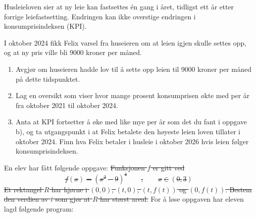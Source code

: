 Husleieloven sier at ny leie kan fastsettes én gang i året, tidligst
ett år etter forrige leiefastsetting. Endringen kan ikke overstige
endringen i konsumprisindeksen (KPI). \os

I oktober 2024 fikk Felix varsel fra huseieren om at leien igjen
skulle settes opp, og at ny pris ville bli 9000 kroner per måned.

\begin{enumerate}
	\item[a)] Avgjør om huseieren hadde lov til å
	sette opp leien til 9000 kroner per måned på dette tidspunktet.
	\item[b)] Lag en oversikt som viser hvor mange prosent konsumprisen
	økte med per år fra oktober 2021 til oktober 2024.
	\item[c)] Anta at KPI fortsetter å øke med like mye per år som det du fant i oppgave b), og ta utgangspunkt i at Felix betalete den høyeste leien loven tillater i oktober 2024. Finn hva Felix betaler i husleie i oktober 2026 hvis leien følger konsumprisindeksen.
\end{enumerate}




En elev har fått følgende oppgave:
\st{
	Funksjonen $ f $ er gitt ved
	\[ f(x)=(x^2-9)^4\qquad,\qquad x\in(0, 3) \]
	Et rektangel $ R $ har hjørne i $ (0, 0) $, $ (t, 0) $, $ (t, f(t)) $ og $ (0, f(t)) $.	\os
	Bestem den verdien av $ t $ som gjør at $ R $ har størst areal.
}
For å løse oppgaven har eleven lagd følgende program:

